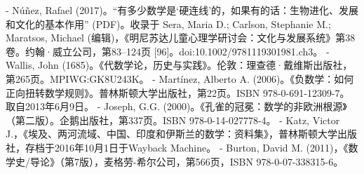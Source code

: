 \begin{enumerate}
- Núñez, Rafael (2017)。“有多少数学是‘硬连线’的，如果有的话：生物进化、发展和文化的基本作用” (PDF)。收录于 Sera, Maria D.; Carlson, Stephanie M.; Maratsos, Michael (编辑)，《明尼苏达儿童心理学研讨会：文化与发展系统》第38卷。约翰·威立公司，第83–124页 [96]。doi:10.1002/9781119301981.ch3。
- Wallis, John (1685)。《代数学论，历史与实践》。伦敦：理查德·戴维斯出版社，第265页。MPIWG:GK8U243K。
- Martínez, Alberto A. (2006)。《负数学：如何正向扭转数学规则》。普林斯顿大学出版社，第22页。ISBN 978-0-691-12309-7。取自2013年6月9日。
- Joseph, G.G. (2000)。《孔雀的冠冕：数学的非欧洲根源》（第二版）。企鹅出版社，第337页。ISBN 978-0-14-027778-4。
- Katz, Victor J.，《埃及、两河流域、中国、印度和伊斯兰的数学：资料集》，普林斯顿大学出版社，存档于2016年10月1日于Wayback Machine。
- Burton, David M. (2011)，《数学史/导论》（第7版），麦格劳-希尔公司，第566页，ISBN 978-0-07-338315-6。
\end{enumerate}